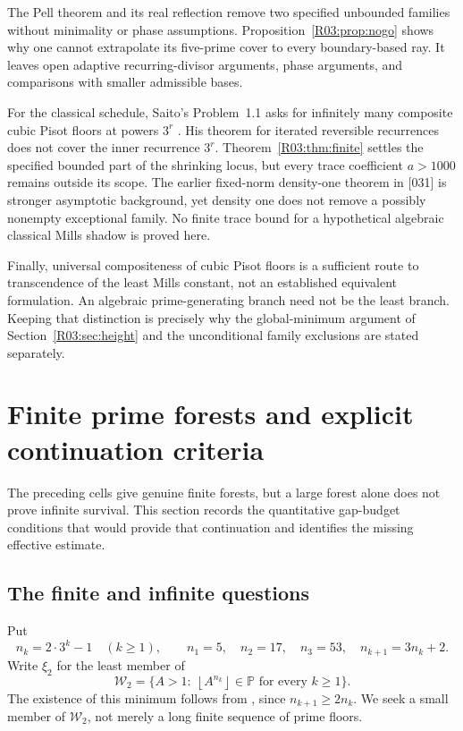 \documentclass[11pt,a4paper]{article}
\theoremstyle{definition}\newtheorem{definition}[theorem]{Definition}
\theoremstyle{remark}\newtheorem{remark}[theorem]{Remark}
\newcommand{\PP}{\mathbb P}\newcommand{\W}{\mathcal W}\newcommand{\SaitoL}{\mathcal S}
\newcommand{\floor}[1]{\left\lfloor#1\right\rfloor}
\begin{document}
The Pell theorem and its real reflection remove two specified
unbounded families without minimality or phase assumptions.
Proposition~\ref{R03:prop:nogo}
shows why one cannot extrapolate its five-prime cover to every
boundary-based ray. It leaves open adaptive recurring-divisor arguments,
phase arguments, and comparisons with smaller admissible bases.

For the classical schedule, Saito's Problem~1.1 asks for infinitely
many composite cubic Pisot floors at powers $3^r$
\cite{SaitoIntervals}. His theorem for iterated reversible recurrences
does not cover the inner recurrence $3^r$. Theorem~\ref{R03:thm:finite}
settles the specified bounded part of the shrinking locus, but every
trace coefficient $a>1000$ remains outside its scope. The earlier
fixed-norm density-one theorem in [031] is stronger asymptotic
background, yet density one does not remove a possibly nonempty
exceptional family. No finite trace bound for a hypothetical
algebraic classical Mills shadow is proved here.

Finally, universal compositeness of cubic Pisot floors is a sufficient
route to transcendence of the least Mills constant, not an established
equivalent formulation. An algebraic prime-generating branch need
not be the least branch. Keeping that distinction is precisely why
the global-minimum argument of Section~\ref{R03:sec:height} and the
unconditional family exclusions are stated separately.



\endgroup

\section{Finite prime forests and explicit continuation criteria}\label{src:R05}
The preceding cells give genuine finite forests, but a large forest alone does not prove infinite survival. This section records the quantitative gap-budget conditions that would provide that continuation and identifies the missing effective estimate.
\medskip
\begingroup



\subsection{The finite and infinite questions}

Put
\begin{equation}\label{R05:eq:schedule}
 n_k=2\cdot3^k-1\quad(k\ge1),\qquad
 n_1=5,\quad n_2=17,\quad n_3=53,\quad n_{k+1}=3n_k+2.
\end{equation}
Write $\xi_2$ for the least member of
\[
 \mathcal W_2=\{A>1:\ \floor{A^{n_k}}\in\PP\text{ for every }k\ge1\}.
\]
The existence of this minimum follows from
\cite[Theorem~1.3]{Saito}, since $n_{k+1}\ge2n_k$.
We seek a small member of $\mathcal W_2$, not merely a long finite
sequence of prime floors.
\end{document}
